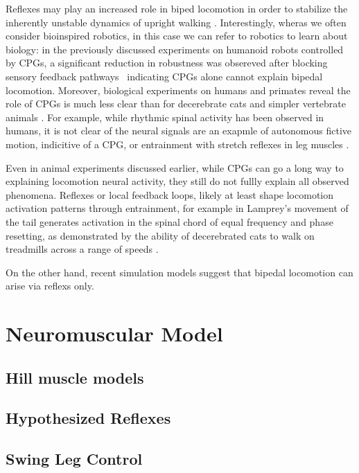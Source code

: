 Reflexes may play an increased role in biped locomotion in order to
stabilize the inherently unstable dynamics of upright walking
\citep{capaday2002special}. Interestingly, wheras we often consider bioinspired
robotics, in this case we can refer to robotics to learn about biology: in the
previously discussed experiments on humanoid robots controlled by CPGs, a
significant reduction in robustness was obsereved after blocking sensory
feedback pathways~\citep{endo2005experimental, righetti2006programmable}
indicating CPGs alone cannot explain bipedal locomotion. Moreover, biological
experiments on humans and primates reveal the role of CPGs is much less clear
than for decerebrate cats and simpler vertebrate animals
\citep{mackay2002central, vaughan2003theories, nielsen2003we}. For example,
while rhythmic spinal activity has been observed in humans, it is not clear of
the neural signals are an exapmle of autonomous fictive motion, indicitive of a
CPG, or entrainment with stretch reflexes in leg muscles
\citep{capaday2002special, stewart1991modulation}. 

Even in animal experiments discussed earlier, while CPGs can go a long way to
explaining locomotion neural activity, they still do not fullly explain all
observed phenomena. Reflexes or local feedback loops, likely at least shape
locomotion activation patterns through entrainment, for example in Lamprey's
movement of the tail generates activation in the spinal chord of equal frequency
\citep{mcclellan1993mechanosensory} and phase resetting, as demonstrated by the
ability of decerebrated cats to walk on treadmills across a range of speeds
\citep{rossignol2000locomotion}.
                    
On the other hand, recent simulation models suggest that bipedal locomotion can
arise via reflexs only. 


\section{Neuromuscular Model}

\subsection{Hill muscle models}
\subsection{Hypothesized Reflexes}
\subsection{Swing Leg Control}
